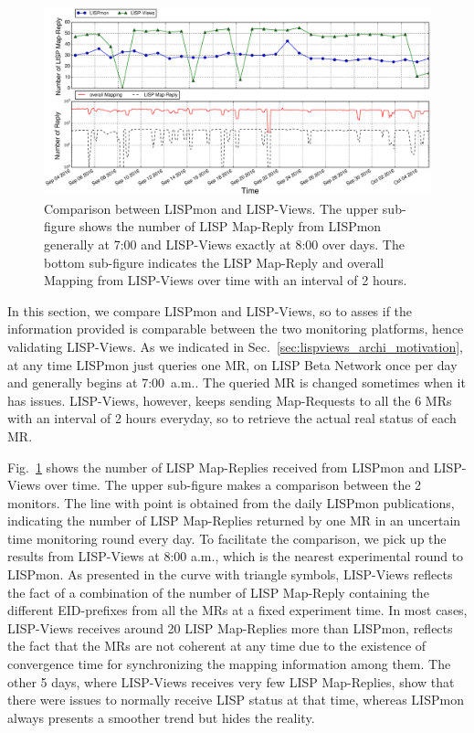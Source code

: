 \begin{figure}[!t]
     \centering
     \includegraphics[width=1.1\textwidth]{Pics/LISPmon_comparison_all.eps}
     \caption{Comparison between LISPmon and LISP-Views. The upper
sub-figure shows the number of LISP Map-Reply from LISPmon generally at
7:00 and LISP-Views exactly at 8:00 over days. The bottom sub-figure
indicates the LISP Map-Reply and overall Mapping from LISP-Views over time with
an interval of 2 hours.}
     \label{lispmon_comparison}
\end{figure}

In this section, we compare LISPmon and LISP-Views, so to asses if the information provided is comparable between the two monitoring platforms, hence validating LISP-Views.  As we indicated in Sec.~\ref{sec:lispviews_archi_motivation}, at any time LISPmon just queries one MR, on LISP Beta Network once per day and generally begins at 7:00~a.m.. The queried MR is changed sometimes when it has issues. LISP-Views, however, keeps sending Map-Requests to all the 6 MRs with an interval of 2 hours everyday, so to retrieve the actual real status of each MR.

Fig.~\ref{lispmon_comparison} shows the number of LISP Map-Replies received from LISPmon and LISP-Views over time. The upper sub-figure makes a comparison between the 2 monitors. The line with point is obtained from the daily LISPmon publications, indicating the number of LISP Map-Replies returned by one MR in an uncertain time monitoring round every day. To facilitate the comparison, we pick up the results from LISP-Views at 8:00 a.m., which is the nearest experimental round to LISPmon. As presented in the curve with triangle symbols, LISP-Views reflects the fact of a combination of the number of LISP Map-Reply containing the different EID-prefixes from all the MRs at a fixed experiment time. In most cases, LISP-Views receives around 20 LISP Map-Replies more than LISPmon, reflects the fact that the MRs are not coherent at any time due to the existence of convergence time for synchronizing the mapping information among them. The other 5 days, where LISP-Views receives very few LISP Map-Replies, show that there were issues to normally receive LISP status at that time, whereas LISPmon always presents a smoother trend but hides the reality.

